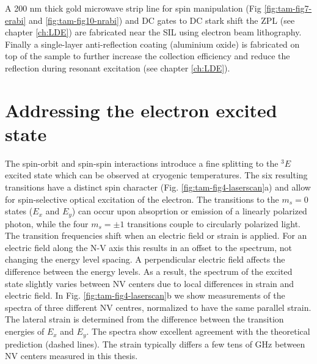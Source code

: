 A 200 nm thick gold microwave strip line for spin manipulation (Fig \ref{fig:tam-fig7-erabi} and \ref{fig:tam-fig10-nrabi}) and DC gates to DC stark shift the ZPL (see chapter \ref{ch:LDE}) are  fabricated near the SIL using electron beam lithography. Finally a single-layer anti-reflection coating\cite{Yeung__2012} (aluminium oxide) is fabricated on top of the sample to further increase the collection efficiency and reduce the reflection during resonant excitation (see chapter \ref{ch:LDE}).

\section{Addressing the electron excited state}
\label{sec:opticalcontrol}

The spin-orbit and spin-spin interactions introduce a fine splitting to the $^3E$ excited state which can be observed at cryogenic temperatures. The six resulting transitions have a distinct spin character (Fig. \ref{fig:tam-fig4-laserscan}a) and allow for spin-selective optical excitation of the electron. The transitions to the $m_s = 0$ states ($E_x$ and $E_y$) can occur upon absoprtion or emission of a linearly polarized photon, while the four $m_s = \pm 1$ transitions couple to circularly polarized light. The transition frequencies shift when an electric field or strain is applied. For an electric field along the N-V axis this results in an offset to the spectrum, not changing the energy level spacing. A perpendicular electric field affects the difference between the energy levels. As a result, the spectrum of the excited state slightly varies between NV centers due to local differences in strain and electric field. In Fig. \ref{fig:tam-fig4-laserscan}b we show measurements of the spectra of three different NV centres, normalized to have the same parallel strain. The lateral strain is determined from the difference between the transition energies of $E_x$ and $E_y$. The spectra show excellent agreement with the theoretical prediction (dashed lines). The strain typically differs a few tens of GHz between NV centers measured in this thesis.

